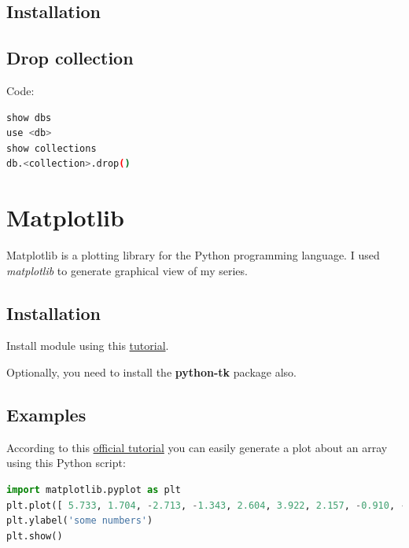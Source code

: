 \documentclass[12pt, a4paper, portrait]{article}
\begin{document}
\subsection{Installation}
\subsection{Drop collection}
Code:
\begin{lstlisting}[language=bash, caption=MongoDB shell commands to drop a collection]
show dbs
use <db>
show collections
db.<collection>.drop()
\end{lstlisting}

\pagebreak
\section{Matplotlib}
Matplotlib is a plotting library for the Python programming language.
I used \textit{matplotlib} to generate graphical view of my series.
\subsection{Installation}
Install module using this \href{https://matplotlib.org/users/installing.html#linux-using-your-package-manager}{tutorial}.
\par Optionally, you need to install the \textbf{python-tk} package also.
\subsection{Examples}
According to this \href{https://matplotlib.org/users/pyplot_tutorial.html}{official tutorial} you can easily generate a plot about an array using this Python script:
\begin{lstlisting}[language=Python]
import matplotlib.pyplot as plt
plt.plot([ 5.733, 1.704, -2.713, -1.343, 2.604, 3.922, 2.157, -0.910, -2.414, -2.943, -1.526, -0.823])
plt.ylabel('some numbers')
plt.show()
\end{lstlisting}
\end{document}
